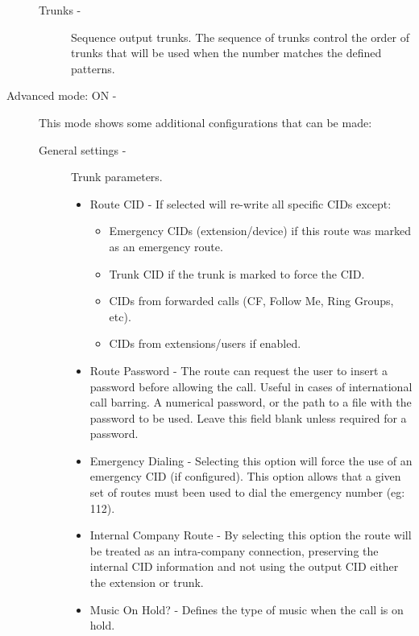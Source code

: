 \begin{description}
\begin{description}
            \item[Trunks -] Sequence output trunks. The sequence of trunks control the order of trunks that will be used when the number matches the defined patterns.
        \end{description}
	\item[Advanced mode: ON -] This mode shows some additional configurations that can be made:
        \begin{description}
            \item[General settings -] Trunk parameters.
                \begin{itemize}
                    \item Route CID - If selected will re-write all specific CIDs except:
                        \begin{itemize}
                            \item Emergency CIDs (extension/device) if this route was marked as an emergency route.
                            \item Trunk CID if the trunk is marked to force the CID.
                            \item CIDs from forwarded calls (CF, Follow Me, Ring Groups, etc).
                            \item CIDs from extensions/users if enabled.
                        \end{itemize}                       
                    \item Route Password - The route can request the user to insert a password before allowing the call. Useful in cases of international call barring.
                       A numerical password, or the path to a file with the password to be used. Leave this field blank unless required for a password.
                    \item Emergency Dialing - Selecting this option will force the use of an emergency CID (if configured). This option allows that a given set of routes must been used to dial the emergency number (eg: 112).
                    \item Internal Company Route - By selecting this option the route will be treated as an intra-company connection, preserving the internal CID information and not using the output CID either the extension or trunk.
                    \item Music On Hold? - Defines the type of music when the call is on hold.
                \end{itemize}            
        \end{description}
\end{description}


